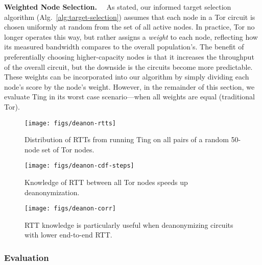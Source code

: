 \medskip

\noindent
\textbf{Weighted Node Selection.}~~
%
As stated, our informed target selection algorithm
(Alg.~\ref{alg:target-selection}) assumes that each node in a Tor
circuit is chosen uniformly at random from the set of all active nodes.
%
In practice, Tor no longer operates this way, but rather assigns a
\emph{weight} to each node, reflecting how its measured bandwidth
compares to the overall population's.
%
The benefit of preferentially choosing higher-capacity nodes is that it
increases the throughput of the overall circuit, but the downside is
the circuits become more predictable.
%
These weights can be incorporated into our algorithm by simply dividing
each node's score by the node's weight.
%
However, in the remainder of this section, we evaluate Ting in its
worst case scenario---when all weights are equal (traditional
Tor).



\begin{figure*}[t]
\centering
%
\begin{minipage}[t]{.32\textwidth}
\texttt{[image: figs/deanon-rtts]}
\caption{\label{fig:deanon-rtts} Distribution of RTTs from running Ting
on all pairs of a random 50-node set of Tor nodes.}
\end{minipage}
%
\hfill
%
\begin{minipage}[t]{.32\textwidth}
\texttt{[image: figs/deanon-cdf-steps]}
\caption{\label{fig:deanon-cdf-steps} Knowledge of RTT between all Tor
nodes speeds up deanonymization.}
\end{minipage}
%
\hfill
%
\begin{minipage}[t]{.32\textwidth}
\texttt{[image: figs/deanon-corr]}
\caption{\label{fig:deanon-corr} RTT knowledge is particularly
useful when deanonymizing circuits with lower end-to-end RTT.}
\end{minipage}
%
\end{figure*}


\subsubsection{Evaluation} %

